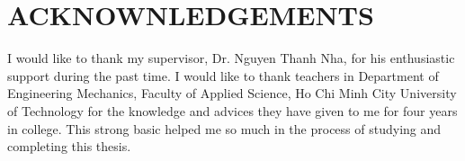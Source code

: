 \chapter*{\centering ACKNOWNLEDGEMENTS}
I would like to thank my supervisor, Dr. Nguyen Thanh Nha, for his enthusiastic support
during the past time. I would like to thank teachers in Department of Engineering
Mechanics, Faculty of Applied Science, Ho Chi Minh City University of Technology for
the knowledge and advices they have given to me for four years in college. This strong
basic helped me so much in the process of studying and completing this thesis.
